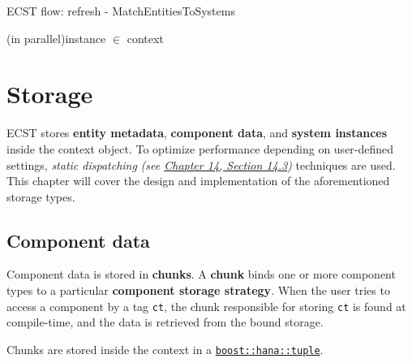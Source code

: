 \documentclass[oneside, 12pt, a4paper, openany]{book}
\begin{document}
\begin{algorithm}[H]

\caption{ECST flow: refresh - MatchEntitiesToSystems}
\footnotesize


    \ForEach(in parallel){instance \I $\in$ context \C}{
    }

\end{algorithm}

\chapter{Storage}\label{storage}

ECST stores \textbf{entity metadata}, \textbf{component data}, and
\textbf{system instances} inside the context object. To optimize
performance depending on user-defined settings, \emph{static
dispatching} \emph{(see
\protect\hyperlink{appendix_static_dispatching}{Chapter 14, Section
14.3})} techniques are used. This chapter will cover the design and
implementation of the aforementioned storage types.

\hypertarget{storage_component}{\section{Component
data}\label{storage_component}}

Component data is stored in \textbf{chunks}. A \textbf{chunk} binds one
or more component types to a particular \textbf{component storage
strategy}. When the user tries to access a component by a tag
\texttt{ct},
the chunk responsible for storing
\texttt{ct}
is found at compile-time, and the data is retrieved from the bound
storage.

Chunks are stored inside the context in a
\href{http://www.boost.org/doc/libs/1_61_0/libs/hana/doc/html/structboost_1_1hana_1_1tuple.html}{\texttt{boost::hana::tuple}}.
\end{document}
